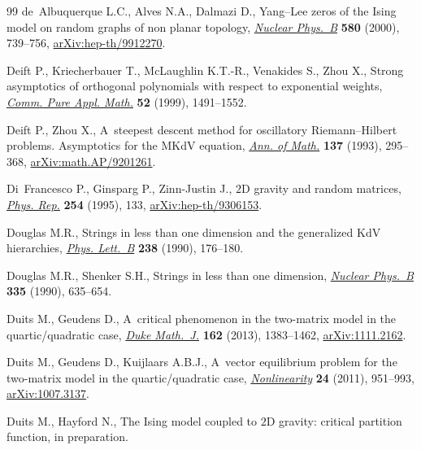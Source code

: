 \documentclass[10pt,a4paper]{amsart}
\numberwithin{equation}{section}
\begin{document}
\begin{thebibliography}{99}
de~Albuquerque L.C., Alves N.A., Dalmazi D., Yang--{L}ee zeros of the {I}sing
 model on random graphs of non planar topology,
 \href{https://doi.org/10.1016/S0550-3213(00)00290-X}{\textit{Nuclear
 Phys.~B}} \textbf{580} (2000), 739--756,
 \href{http://arxiv.org/abs/hep-th/9912270}{arXiv:hep-th/9912270}.

Deift P., Kriecherbauer T., McLaughlin K.T.-R., Venakides S., Zhou X., Strong
 asymptotics of orthogonal polynomials with respect to exponential weights,
 \href{https://doi.org/10.1002/(SICI)1097-0312(199912)52:12%3C1491::AID-CPA2%3E3.0.CO;2-%23}{\textit{Comm.
 Pure Appl. Math.}} \textbf{52} (1999), 1491--1552.

Deift P., Zhou X., A~steepest descent method for oscillatory
 {R}iemann--{H}ilbert problems. {A}symptotics for the {MK}d{V} equation,
 \href{https://doi.org/10.2307/2946540}{\textit{Ann. of Math.}} \textbf{137}
 (1993), 295--368,
 \href{http://arxiv.org/abs/math.AP/9201261}{arXiv:math.AP/9201261}.

Di~Francesco P., Ginsparg P., Zinn-Justin J., {$2$}{D} gravity and random
 matrices, \href{https://doi.org/10.1016/0370-1573(94)00084-G}{\textit{Phys.
 Rep.}} \textbf{254} (1995), 133,
 \href{http://arxiv.org/abs/hep-th/9306153}{arXiv:hep-th/9306153}.

Douglas M.R., Strings in less than one dimension and the generalized {K}d{V}
 hierarchies,
 \href{https://doi.org/10.1016/0370-2693(90)91716-O}{\textit{Phys. Lett.~B}}
 \textbf{238} (1990), 176--180.

Douglas M.R., Shenker S.H., Strings in less than one dimension,
 \href{https://doi.org/10.1016/0550-3213(90)90522-F}{\textit{Nuclear Phys.~B}}
 \textbf{335} (1990), 635--654.

Duits M., Geudens D., A~critical phenomenon in the two-matrix model in the
 quartic/quadratic case,
 \href{https://doi.org/10.1215/00127094-2208757}{\textit{Duke Math.~J.}}
 \textbf{162} (2013), 1383--1462,
 \href{http://arxiv.org/abs/1111.2162}{arXiv:1111.2162}.

Duits M., Geudens D., Kuijlaars A.B.J., A~vector equilibrium problem for the
 two-matrix model in the quartic/quadratic case,
 \href{https://doi.org/10.1088/0951-7715/24/3/012}{\textit{Nonlinearity}}
 \textbf{24} (2011), 951--993,
 \href{http://arxiv.org/abs/1007.3137}{arXiv:1007.3137}.

Duits M., Hayford N., The {I}sing model coupled to {$2$}{D} gravity: critical
 partition function, {i}n preparation.


\end{thebibliography}
\end{document}
